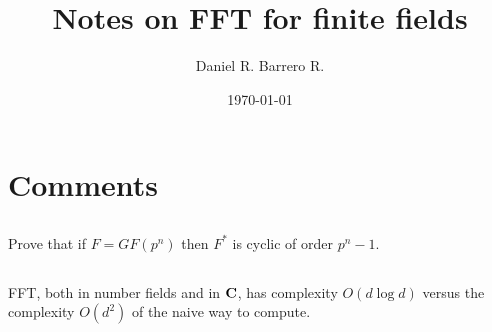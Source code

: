 \documentclass{amsart}
\title{Notes on FFT for finite fields}
\author{Daniel R. Barrero R.}
\date{\today}
\begin{document}
\maketitle

\section{} %



\section{Comments}

\subsection{} Prove that if $F = GF(p^n)$ then $F^*$ is cyclic of order
$p^n - 1$.

\subsection{} FFT, both in number fields and in $\mathbf{C}$, has complexity
$O(d \log d)$ versus the complexity $O(d^2)$ of the naive way to compute.



\end{document}
